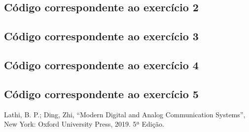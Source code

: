 \documentclass[a4paper,12pt,oneside,openany,table,xcdraw]{article}
\begin{document}

\vspace{0.3cm}


\vspace{0.3cm}



\vspace{0.3cm}
\subsection{Código correspondente ao exercício 2} \label{anexo:ex2}


\vspace{0.3cm}
\subsection{Código correspondente ao exercício 3} \label{anexo:ex3}

\vspace{0.3cm}



\vspace{0.3cm}
\subsection{Código correspondente ao exercício 4} \label{anexo:ex4}

\vspace{0.3cm}



\vspace{0.3cm}
\subsection{Código correspondente ao exercício 5} \label{anexo:ex4}


\newpage
\begin{thebibliography}{9} 


    Lathi, B. P.; Ding, Zhi,
    “Modern Digital and Analog Communication Systems”, New York: 
    Oxford University Press, 2019. 5ª Edição.

\end{thebibliography}
\end{document}
